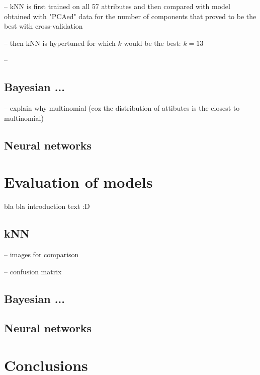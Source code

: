 \documentclass[11pt,a4paper]{article}
\begin{document}
-- kNN is first trained on all 57 attributes and then compared with model obtained with "PCAed" data for the number of components that proved to be the best with cross-validation

-- then kNN is hypertuned for which $k$ would be the best: $k=13$

-- 


\subsection{Bayesian ...}

-- explain why multinomial (coz the distribution of attibutes is the closest to multinomial) 

\subsection{Neural networks}


\section{Evaluation of models}
\label{sec-evaluation}

bla bla introduction text :D

\subsection{kNN}

-- images for comparison

-- confusion matrix


\subsection{Bayesian ...}

\subsection{Neural networks}


\section{Conclusions}
\end{document}
